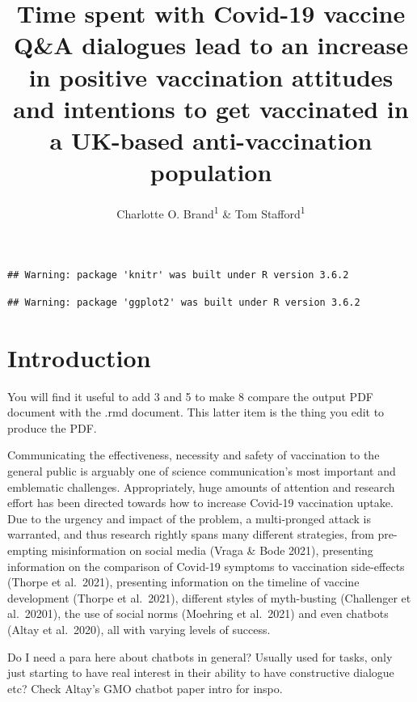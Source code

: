 \documentclass[
  english,
  ,jou,floatsintext]{apa6}
\title{Time spent with Covid-19 vaccine Q\&A dialogues lead to an increase in positive vaccination attitudes and intentions to get vaccinated in a UK-based anti-vaccination population}
\author{Charlotte O. Brand\textsuperscript{1} \& Tom Stafford\textsuperscript{1}}
\date{}
\affiliation{\vspace{0.5cm}\textsuperscript{1} University of Sheffield, Department of Psychology, Faculty of Science}
\begin{document}
\maketitle

\begin{verbatim}
## Warning: package 'knitr' was built under R version 3.6.2
\end{verbatim}

\begin{verbatim}
## Warning: package 'ggplot2' was built under R version 3.6.2
\end{verbatim}

\hypertarget{introduction}{%
\section{Introduction}\label{introduction}}

You will find it useful to add 3 and 5 to make 8 compare the output PDF document with the .rmd document. This latter item is the thing you edit to produce the PDF.

Communicating the effectiveness, necessity and safety of vaccination to the general public is arguably one of science communication's most important and emblematic challenges. Appropriately, huge amounts of attention and research effort has been directed towards how to increase Covid-19 vaccination uptake. Due to the urgency and impact of the problem, a multi-pronged attack is warranted, and thus research rightly spans many different strategies, from pre-empting misinformation on social media (Vraga \& Bode 2021), presenting information on the comparison of Covid-19 symptoms to vaccination side-effects (Thorpe et al.~2021), presenting information on the timeline of vaccine development (Thorpe et al.~2021), different styles of myth-busting (Challenger et al.~20201), the use of social norms (Moehring et al.~2021) and even chatbots (Altay et al.~2020), all with varying levels of success.

Do I need a para here about chatbots in general? Usually used for tasks, only just starting to have real interest in their ability to have constructive dialogue etc? Check Altay's GMO chatbot paper intro for inspo.
\end{document}
